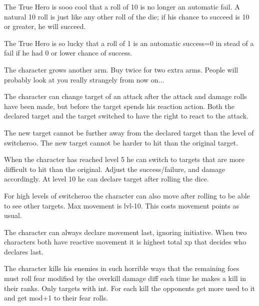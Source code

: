  The True Hero is sooo cool that a roll of 10 is no longer an automatic fail. A natural 10 roll is just like any other roll of the die; if his chance to succeed is 10 or greater, he will succeed.


 The True Hero is so lucky that a roll of 1 is an automatic success=0 in stead of a fail if he had 0 or lower chance of success.


 The character grows another arm. Buy twice for two extra arms. People will probably look at you really strangely from now on...


 The character can change target of an attack after the attack and damage rolls have been made, but before the target spends his reaction action. Both the declared target and the target  switched to have the right to react to the attack.

The new target cannot be further away from the declared target than the level of switcheroo. The new target cannot be harder to hit than the original target.

When the character has reached level 5 he can switch to targets that are more difficult to hit than the original. Adjust the success/failure, and damage accordingly. At level 10 he can declare target after rolling the dice.

For high levels of switcheroo the character can also move after rolling to be able to see other targets. Max movement is lvl-10. This costs movement points as usual.


 The character can always declare movement last, ignoring initiative. When two characters both have reactive movement it is highest total xp that decides who declares last.


 The character kills his enemies in such horrible ways that the remaining foes must roll fear modified by the overkill damage diff each time he makes a kill in their ranks. Only targets with int. For each kill the opponents get more used to it and get mod+1 to their fear rolls.




